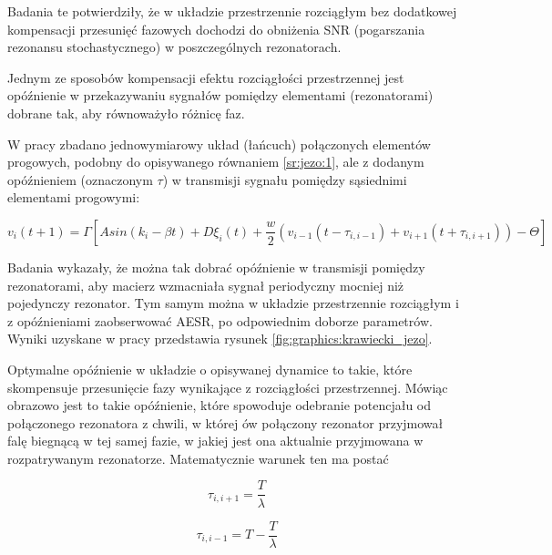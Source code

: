   Badania te potwierdziły, że w układzie przestrzennie rozciągłym bez dodatkowej kompensacji przesunięć fazowych dochodzi do obniżenia SNR (pogarszania rezonansu stochastycznego) w poszczególnych rezonatorach.

  Jednym ze sposobów kompensacji efektu rozciągłości przestrzennej jest opóźnienie w przekazywaniu sygnałów pomiędzy elementami (rezonatorami) dobrane tak, aby równoważyło różnicę faz. 

  W pracy \cite{ijmpb_23_2} zbadano jednowymiarowy układ (łańcuch) połączonych elementów progowych, podobny do opisywanego równaniem \ref{sr:jezo:1}, ale z dodanym opóźnieniem (oznaczonym $\tau$) w transmisji sygnału pomiędzy sąsiednimi elementami progowymi:

  \begin{equation} \label{sr:jezo:2}
    v_i (t+1) = \Gamma [A sin (k_i - \beta t) + D \xi_i (t) + \frac{w}{2}(v_{i-1}(t-\tau_{i,i-1}) + v_{i+1}(t+\tau_{i,i+1})) - \Theta]
  \end{equation}

  Badania wykazały, że można tak dobrać opóźnienie w transmisji pomiędzy rezonatorami, aby macierz wzmacniała sygnał periodyczny mocniej niż pojedynczy rezonator. Tym samym można w układzie przestrzennie rozciągłym i z opóźnieniami zaobserwować AESR, po odpowiednim doborze parametrów. Wyniki uzyskane w pracy \cite{ijmpb_23_2} przedstawia rysunek \ref{fig:graphics:krawiecki_jezo}.

  Optymalne opóźnienie w układzie o opisywanej dynamice to takie, które skompensuje przesunięcie fazy wynikające z rozciągłości przestrzennej. Mówiąc obrazowo jest to takie opóźnienie, które spowoduje odebranie potencjału od połączonego rezonatora z chwili, w której ów połączony rezonator przyjmował falę biegnącą w tej samej fazie, w jakiej jest ona aktualnie przyjmowana w rozpatrywanym rezonatorze. Matematycznie warunek ten ma postać

  \begin{equation} \label{sr:jezo:3a}
    \tau_{i,i+1} = \frac{T}{\lambda}
  \end{equation}

  \begin{equation} \label{sr:jezo:3b}
    \tau_{i,i-1} = T - \frac{T}{\lambda}
  \end{equation}

